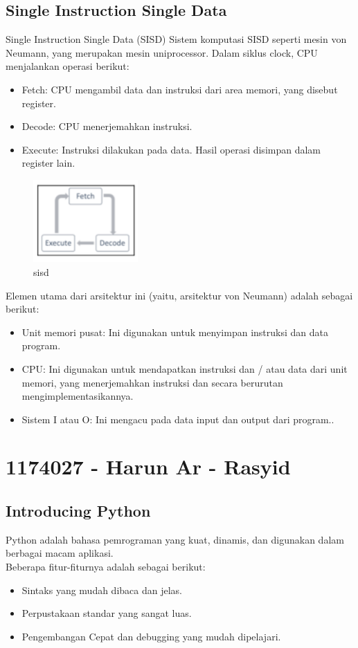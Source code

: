 \subsection{Single Instruction Single Data}
\hfill\break
Single Instruction Single Data (SISD) Sistem komputasi SISD seperti mesin von Neumann, yang merupakan mesin uniprocessor. 
Dalam siklus clock, CPU menjalankan operasi berikut:
\begin{itemize}
	\item Fetch: CPU mengambil data dan instruksi dari area memori, yang disebut register.
	\item Decode: CPU menerjemahkan instruksi.
	\item Execute: Instruksi dilakukan pada data. Hasil operasi disimpan dalam register lain.
\end{itemize}
\hfill\break
    \begin{figure}[H]
        \includegraphics[width=4cm]{figures/kelompok3/1/arjun2.png}
        \centering
        \caption{sisd}
    \end{figure}
\hfill\break
Elemen utama dari arsitektur ini (yaitu, arsitektur von Neumann) adalah sebagai berikut:
\begin{itemize}
	\item Unit memori pusat: Ini digunakan untuk menyimpan instruksi dan data program.
	\item CPU: Ini digunakan untuk mendapatkan instruksi dan / atau data dari unit memori, yang menerjemahkan instruksi dan secara berurutan mengimplementasikannya.
	\item Sistem I atau  O: Ini mengacu pada data input dan output dari program..
\end{itemize}

\section{1174027 - Harun Ar - Rasyid}
\subsection{Introducing Python}
\hfill\break
Python adalah bahasa pemrograman yang kuat, dinamis, dan digunakan dalam berbagai macam aplikasi. \\
Beberapa fitur-fiturnya adalah sebagai berikut:
\begin{itemize}
    \item Sintaks yang mudah dibaca dan jelas.
    \item Perpustakaan standar yang sangat luas.
    \item Pengembangan Cepat dan debugging yang mudah dipelajari.
\end{itemize}

